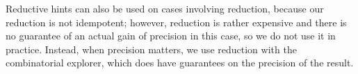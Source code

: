 \documentclass[sttt]{svjour}
\begin{document}
Reductive hints can also be used on cases involving reduction, because our reduction is not idempotent; however, reduction is rather expensive and there is no guarantee of an actual gain of precision in this case, so we do not use it in practice. Instead, when precision matters, we use reduction with the combinatorial explorer, which does have guarantees on the precision of the result.
% 
% 
% 
% 
\end{document}
